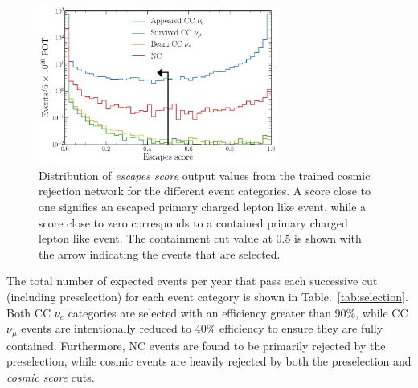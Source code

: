 \begin{figure} %
    \includegraphics[width=0.7\textwidth]{diagrams/7-results/final_escapes_outputs.pdf}
    \caption[Distribution of escapes score output values]
    {Distribution of \emph{escapes score} output values from the trained cosmic rejection network
        for the different event categories. A score close to one signifies an escaped primary
        charged lepton like event, while a score close to zero corresponds to a contained primary
        charged lepton like event. The containment cut value at 0.5 is shown with the arrow
        indicating the events that are selected.}
    \label{fig:final_escapes_outputs}
\end{figure}

The total number of expected events per year that pass each successive cut (including
preselection) for each event category is shown in Table.~\ref{tab:selection}. Both CC $\nu_{e}$
categories are selected with an efficiency greater than 90\%, while CC $\nu_{\mu}$ events are
intentionally reduced to 40\% efficiency to ensure they are fully contained. Furthermore, NC
events are found to be primarily rejected by the preselection, while cosmic events are heavily
rejected by both the preselection and \emph{cosmic score} cuts.

